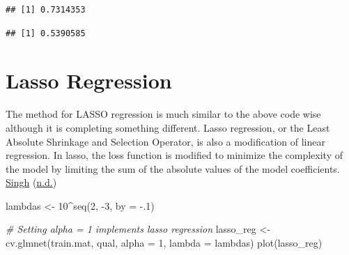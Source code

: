 \documentclass[
]{book}
\newenvironment{Shaded}{\begin{snugshade}}{\end{snugshade}}
\newcommand{\AttributeTok}[1]{\textcolor[rgb]{0.77,0.63,0.00}{#1}}
\newcommand{\CommentTok}[1]{\textcolor[rgb]{0.56,0.35,0.01}{\textit{#1}}}
\newcommand{\DecValTok}[1]{\textcolor[rgb]{0.00,0.00,0.81}{#1}}
\newcommand{\FloatTok}[1]{\textcolor[rgb]{0.00,0.00,0.81}{#1}}
\newcommand{\FunctionTok}[1]{\textcolor[rgb]{0.00,0.00,0.00}{#1}}
\newcommand{\NormalTok}[1]{#1}
\newcommand{\OtherTok}[1]{\textcolor[rgb]{0.56,0.35,0.01}{#1}}
\newcommand{\SpecialCharTok}[1]{\textcolor[rgb]{0.00,0.00,0.00}{#1}}
\begin{document}
\begin{verbatim}
## [1] 0.7314353
\end{verbatim}

\begin{Shaded}
\end{Shaded}

\begin{verbatim}
## [1] 0.5390585
\end{verbatim}

\hypertarget{lasso-regression-1}{%
\section{Lasso Regression}\label{lasso-regression-1}}

The method for LASSO regression is much similar to the above code wise although it is completing something different. Lasso regression, or the Least Absolute Shrinkage and Selection Operator, is also a modification of linear regression. In lasso, the loss function is modified to minimize the complexity of the model by limiting the sum of the absolute values of the model coefficients. \protect\hyperlink{ref-regression_r}{Singh} (\protect\hyperlink{ref-regression_r}{n.d.})

\begin{Shaded}
\begin{Highlighting}[]
\NormalTok{lambdas }\OtherTok{\textless{}{-}} \DecValTok{10}\SpecialCharTok{\^{}}\FunctionTok{seq}\NormalTok{(}\DecValTok{2}\NormalTok{, }\SpecialCharTok{{-}}\DecValTok{3}\NormalTok{, }\AttributeTok{by =} \SpecialCharTok{{-}}\NormalTok{.}\DecValTok{1}\NormalTok{)}

\CommentTok{\# Setting alpha = 1 implements lasso regression}
\NormalTok{lasso\_reg }\OtherTok{\textless{}{-}} \FunctionTok{cv.glmnet}\NormalTok{(train.mat, qual, }\AttributeTok{alpha =} \DecValTok{1}\NormalTok{, }\AttributeTok{lambda =}\NormalTok{ lambdas)}
\FunctionTok{plot}\NormalTok{(lasso\_reg)}
\end{Highlighting}
\end{Shaded}
\end{document}
